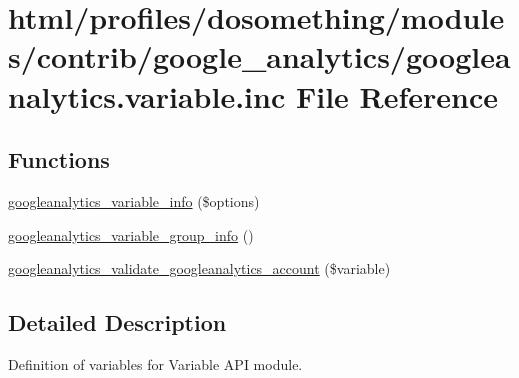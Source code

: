 \hypertarget{googleanalytics_8variable_8inc}{
\section{html/profiles/dosomething/modules/contrib/google\_\-analytics/googleanalytics.variable.inc File Reference}
\label{googleanalytics_8variable_8inc}
}
\subsection*{Functions}
\begin{DoxyCompactItemize}
\item 
\hyperlink{googleanalytics_8variable_8inc_a4a262bcf11c375169feb76c1e38a35a3}{googleanalytics\_\-variable\_\-info} (\$options)
\item 
\hyperlink{googleanalytics_8variable_8inc_a8d64082a3e1b77233e32bf820be02dcb}{googleanalytics\_\-variable\_\-group\_\-info} ()
\item 
\hyperlink{googleanalytics_8variable_8inc_a8cf03fc414b321f61ef33b0b40e532be}{googleanalytics\_\-validate\_\-googleanalytics\_\-account} (\$variable)
\end{DoxyCompactItemize}


\subsection{Detailed Description}
Definition of variables for Variable API module. 

